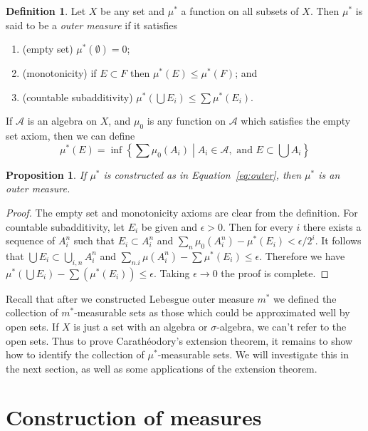 \documentclass[11pt,oneside]{amsbook}
\theoremstyle{definition}
\theoremstyle{plain}
\newtheorem{prop}[thm]{Proposition}
\theoremstyle{definition}
\newtheorem{defn}[thm]{Definition}
\theoremstyle{remark}
\numberwithin{equation}{section}
\numberwithin{figure}{section}
\begin{document}
\begin{defn}
  Let $X$ be any set and $\mu^*$ a function on all subsets of $X$. Then $\mu^*$ is said to be a \emph{outer measure} if it satisfies
  \begin{enumerate}
  \item (empty set) $\mu^*(\emptyset)=0$;
  \item (monotonicity) if $E\subset F$ then $\mu^*(E)\leq\mu^*(F)$; and
  \item (countable subadditivity) $\mu^*(\bigcup E_i)\leq\sum\mu^*(E_i)$.
  \end{enumerate}
\end{defn}

If $\mathcal A$ is an algebra on $X$, and $\mu_0$ is any function on $\mathcal A$ which satisfies the empty set axiom, then we can define
\begin{equation}
  \label{eq:outer}
  \mu^*(E)=\inf\left\{\left.\sum\mu_0(A_i)\;\right|\;A_i\in\mathcal A,\text{ and }E\subset\bigcup A_i\right\}
\end{equation}

\begin{prop}
  If $\mu^*$ is constructed as in Equation~\eqref{eq:outer}, then $\mu^*$ is an outer measure.
\end{prop}

\begin{proof}
  The empty set and monotonicity axioms are clear from the definition. For countable subadditivity, let $E_i$ be given and $\epsilon>0$. Then for every $i$ there exists a sequence of $A_i^n$ such that $E_i\subset A_i^n$ and $\sum_n\mu_0(A_i^n)-\mu^*(E_i)<\epsilon/2^i$. It follows that $\bigcup E_i\subset\bigcup_{i,n} A_i^n$ and $\sum_{n.i}\mu(A_i^n)-\sum\mu^*(E_i)\leq\epsilon$. Therefore we have $\mu^*(\bigcup E_i)-\sum(\mu^*(E_i))\leq\epsilon$. Taking $\epsilon\to0$ the proof is complete.
\end{proof}

Recall that after we constructed Lebesgue outer measure $m^*$ we defined the collection of $m^*$-measurable sets as those which could be approximated well by open sets. If $X$ is just a set with an algebra or $\sigma$-algebra, we can't refer to the open sets. Thus to prove Carath\'eodory's extension theorem, it remains to show how to identify the collection of $\mu^*$-measurable sets. We will investigate this in the next section, as well as some applications of the extension theorem.


\section{Construction of measures}
\end{document}
